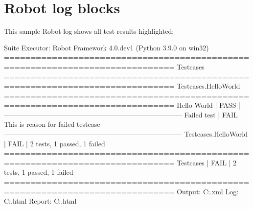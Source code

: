 %
%
%
\chapter{Robot log blocks}

This sample Robot log shows all test results highlighted:

\begin{robotlog}[caption=Robot log example, 
                 label=label2,
                 linebackgroundcolor=\hllog{7,9}]
Suite Executor: Robot Framework 4.0.dev1 (Python 3.9.0 on win32)
==============================================================================
Testcases                                                                     
==============================================================================
Testcases.HelloWorld                                                          
==============================================================================
Hello World                                                           | PASS |
------------------------------------------------------------------------------
Failed test                                                           | FAIL |
This is reason for failed testcase
------------------------------------------------------------------------------
Testcases.HelloWorld                                                  | FAIL |
2 tests, 1 passed, 1 failed
==============================================================================
Testcases                                                             | FAIL |
2 tests, 1 passed, 1 failed
==============================================================================
Output:  C:\RobotTest\testcases\output.xml
Log:     C:\RobotTest\testcases\log.html
Report:  C:\RobotTest\testcases\report.html
\end{robotlog}